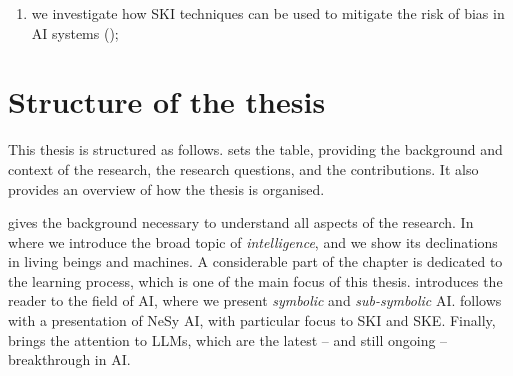 \begin{refsection}
\begin{enumerate}[label=\emph{(\roman*)}]
    \begin{enumerate}[label=\emph{(\arabic*)},resume]
        \item we investigate how \gls{SKI} techniques can be used to mitigate the risk of bias in \gls{AI} systems ();
    \end{enumerate}
\end{enumerate}


\section{Structure of the thesis}
\label{sec:structure-of-the-thesis}
%
This thesis is structured as follows.
%
 sets the table, providing the background and context of the research, the research questions, and the contributions.
%
It also provides an overview of how the thesis is organised.


 gives the background necessary to understand all aspects of the research.
%
In  where we introduce the broad topic of \emph{intelligence}, and we show its declinations in living beings and machines.
%
A considerable part of the chapter is dedicated to the learning process, which is one of the main focus of this thesis.
%
 introduces the reader to the field of \gls{AI}, where we present \emph{symbolic} and \emph{sub-symbolic} \gls{AI}.
%
 follows with a presentation of \gls{NeSy} \gls{AI}, with particular focus to \gls{SKI} and \gls{SKE}.
%
Finally,  brings the attention to \glspl{LLM}, which are the latest -- and still ongoing -- breakthrough in \gls{AI}.


\printbibliography[title=Reference,heading=bibintoc]

\end{refsection}